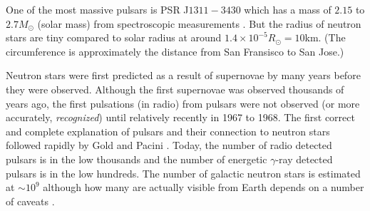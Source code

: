 One of the most massive pulsars is PSR J$1311-3430$ which has a mass
of $2.15$ to $2.7M_{\odot}$ (solar mass) from spectroscopic measurements \citep{romani2012psr}.
But the radius of neutron stars are tiny compared to solar radius at around $1.4\times10^{-5} R_{\odot}=10$km.
(The circumference is approximately the distance from
San Fransisco to San Jose.)

Neutron stars were first predicted as a result of
supernovae by \cite{baade1934super} many years before they
were observed.
Although the first supernovae was observed thousands of years ago,
the first pulsations (in radio) from pulsars were not observed 
(or more accurately, \textit{recognized}) until
relatively recently in 1967 to 1968.
The first correct and complete explanation of pulsars and their
connection to neutron stars followed rapidly by Gold and Pacini
\citep{pacini1967energy, gold1968rotating, pacini1968rotating}.
Today, the number of radio detected pulsars is in the low thousands and the number of energetic $\gamma$-ray
detected pulsars is in the low hundreds.
The number of galactic neutron stars is estimated at $\sim10^9$ although
how many are actually visible from Earth depends on a number of caveats \citep{colpi1998elusiveness}.



